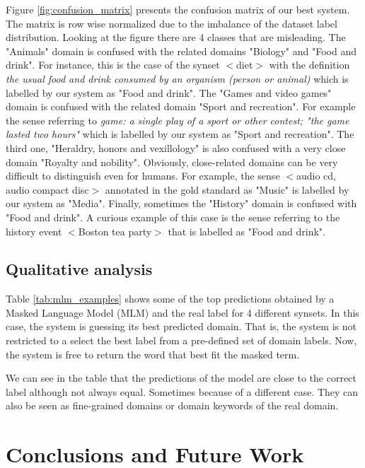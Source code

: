 \documentclass[11pt]{article}
\begin{document}
Figure \ref{fig:confusion_matrix} presents the confusion matrix of our best system. The matrix is row wise normalized due to the imbalance of the dataset label distribution. Looking at the figure there are 4 classes that are misleading. The "Animals" domain is confused with the related domains "Biology" and "Food and drink". For instance, this is the case of the synset $<$diet$>$ with the definition {\it the usual food and drink consumed by an organism (person or animal)} which is labelled by our system as "Food and drink". The "Games and video games" domain is confused with the related domain "Sport and recreation". For example the sense referring to \textit{game: a single play of a sport or other contest; "the game lasted two hours"} which is labelled by our system as "Sport and recreation". The third one, "Heraldry, honors and vexillology" is also confused with a very close domain "Royalty and nobility". Obviously, close-related domains can be very difficult to distinguish even for humans. For example, the sense $<$audio cd, audio compact disc$>$ annotated in the gold standard as "Music" is labelled by our system as "Media".
Finally, sometimes the "History" domain is confused with "Food and drink". A curious example of this case is the sense referring to the history event $<$Boston tea party$>$ that is labelled as "Food and drink". 

\subsection{Qualitative analysis} \label{sseq:qualitative_analysis}

Table \ref{tab:mlm_examples} shows some of the top predictions obtained by a Masked Language Model (MLM) and the real label for 4 different synsets. In this case, the system is guessing its best predicted domain. That is, the system is not restricted to a select the best label from a pre-defined set of domain labels. Now, the system is free to return the word that best fit the masked term.



We can see in the table that the predictions of the model are  close to the correct label although not always equal. Sometimes because of a different case. They can also be seen as fine-grained domains or domain keywords of the real domain. 



\section{Conclusions and Future Work}
\label{conclusions}
\end{document}
